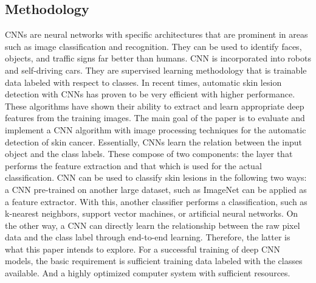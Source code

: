 \documentclass{article}
\begin{document}
\subsection{Methodology}
CNNs are neural networks with specific architectures that are prominent in areas such as image classification and recognition. They can be used to identify faces, objects, and traffic signs far better than humans. CNN is incorporated into robots and self-driving cars. They are supervised learning methodology that is trainable data labeled with respect to classes. 
In recent times, automatic skin lesion detection with CNNs has proven to be very efficient with higher performance. These algorithms have shown their ability to extract and learn appropriate deep features from the training images. The main goal of the paper is to evaluate and implement a CNN algorithm with image processing techniques for the automatic detection of skin cancer.
Essentially, CNNs learn the relation between the input object and the class labels. These compose of two components: the layer that performs the feature extraction and that which is used for the actual classification. 
CNN can be used to classify skin lesions in the following two ways: a CNN pre-trained on another large dataset, such as ImageNet can be applied as a feature extractor. With this, another classifier performs a classification, such as k-nearest neighbors, support vector machines, or artificial neural networks.  On the other way, a CNN can directly learn the relationship between the raw pixel data and the class label through end-to-end learning. Therefore, the latter is what this paper intends to explore. For a successful training of deep CNN models, the basic requirement is sufficient training data labeled with the classes available. And a highly optimized computer system with sufficient resources.
\end{document}
